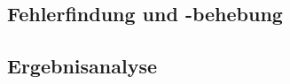 \documentclass{kis}
\begin{document}
\subsection{Fehlerfindung und -behebung}

\subsection{Ergebnisanalyse}

\appendix
\end{document}
